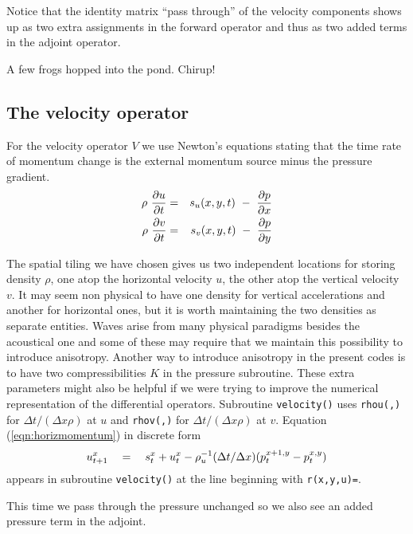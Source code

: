 Notice that the identity matrix ``pass through''
of the velocity components
shows up as two extra assignments in the forward operator
and thus as two added terms in the adjoint operator.

 {
	A few frogs hopped into the pond.
	Chirup!
}

\subsection{The velocity operator}
For the velocity operator $V$ we use Newton's equations stating
that the time rate of momentum change
is the external momentum source minus the pressure gradient.
\begin{eqnarray}				\label{eqn:horizmomentum}
\rho \                {\partial u \over \partial t}
&=& s_u(x,y,t) \ -\   {\partial p \over \partial x} \\
\rho \                {\partial v \over \partial t}
&=& s_v(x,y,t) \ -\   {\partial p \over \partial y}
\end{eqnarray}
\par
The spatial tiling we have chosen gives us two independent locations for
storing density $\rho$,
one atop the horizontal velocity $u$,
the other atop the vertical velocity $v$.
It may seem non physical to have one density
for vertical accelerations and another for horizontal ones,
but it is worth maintaining the two densities
as separate entities.
Waves arise from many physical paradigms besides the
acoustical one and some of these
may require that we maintain this possibility to introduce anisotropy.
Another way to introduce anisotropy in the present codes
is to have two compressibilities $K$ in the pressure subroutine.
These extra parameters might also be helpful if
we were trying to improve the numerical representation
of the differential operators.
Subroutine {\tt velocity()} uses
{\tt rhou(,)} for $\Delta t/(\Delta x \rho)$ at $u$ and
{\tt rhov(,)} for $\Delta t/(\Delta x \rho)$ at $v$.
Equation (\ref{eqn:horizmomentum}) in discrete form
\begin{equation} 				\label{eqn:velocityufd}
u_{t+1}^x \quad =\quad  s_t^x + u_t^x
        - \rho_u^{-1} (\Delta t/ \Delta x)
                (p_t^{x+1,y}-p_t^{x,y})
\end{equation}
appears in subroutine {\tt velocity()}
at the line beginning with {\tt r(x,y,u)=}.


This time we pass through the pressure unchanged
so we also see an added pressure term in the adjoint.

